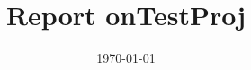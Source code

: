 \documentclass[a4wide]{article}
\title{Report onTestProj} \\
\date{\today}
\begin{document}
\maketitle
\begin{figure}[h]
\caption{ }
\label{fig:example}
\end{figure}
\end{document}

